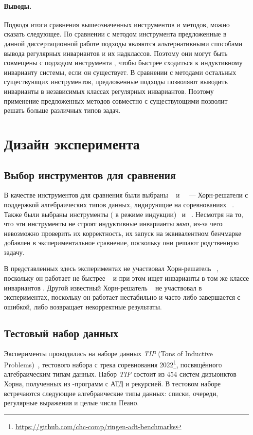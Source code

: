 \paragraph{Выводы.} Подводя итоги сравнения вышеозначенных инструментов и методов, можно сказать следующее. По сравнении с методом инструмента \rchc{} предложенные в данной диссертационной работе подходы являются альтернативными способами вывода регулярных инвариантов и их надклассов. Поэтому они могут быть совмещены с подходом инструмента \rchc{}, чтобы быстрее сходиться к индуктивному инварианту системы, если он существует. В сравнении с методами остальных существующих инструментов, предложенные подходы позволяют выводить инварианты в независимых классах регулярных инвариантов. Поэтому применение предложенных методов совместно с существующими позволит решать больше различных типов задач.

\section{Дизайн эксперимента}
\subsection{Выбор инструментов для сравнения}
В качестве инструментов для сравнения были выбраны \racer{}~\cite{10.1145/3498722} и \eldarica{}~\cite{8603013}~--- Хорн-решатели с поддержкой алгебраических типов данных, лидирующие на соревнованиях \chccomp{}~\cite{De_Angelis_2022}.
Также были выбраны инструменты \cvcind{} (\cvc{} в режиме индукции)~\cite{reynolds2015induction} и \vericat{}~\cite{10.1093/logcom/exab090}.
Несмотря на то, что эти инструменты не строят индуктивные инварианты \emph{явно}, из-за чего невозможно проверить их корректность, их запуск на эквивалентном бенчмарке добавлен в экспериментальное сравнение, поскольку они решают родственную задачу.


В представленных здесь экспериментах не участвовал Хорн-решатель \hoice{}~\cite{10.1007/978-3-030-02768-1_8}, поскольку он работает не быстрее \racer{}~\cite{10.1145/3498722} и при этом ищет инварианты в том же классе инвариантов \elemclass{}.
Другой известный Хорн-решатель \rchc{}~\cite{haude2020} не участвовал в экспериментах, поскольку он работает нестабильно и часто либо завершается с ошибкой, либо возвращает некорректные результаты.

\subsection{Тестовый набор данных}
Эксперименты проводились на наборе данных \emph{TIP} (Tons of Inductive Problems)~\cite{claessen2015tip}, тестового набора с трека соревнования \chccomp{} 2022\footnote{\url{https://github.com/chc-comp/ringen-adt-benchmarks}}, посвящённого алгебраическим типам данных. Набор \emph{TIP} состоит из 454 систем дизъюнктов Хорна, полученных из \haskell{}-программ с АТД и рекурсией.
В тестовом наборе встречаются следующие алгебраические типы данных: списки, очереди, регулярные выражения и целые числа Пеано.

